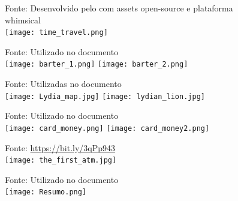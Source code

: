 \documentclass[aspectratio=43,8pt]{beamer}%
\begin{document}
\begin{frame}[noframenumbering]
	\begin{figure}
		\centering
		{\footnotesize Fonte: Desenvolvido pelo com assets open-source e plataforma whimsical}\\
		\texttt{[image: time\_travel.png]}
		\caption{}
	\end{figure}
\end{frame}
\begin{frame}[noframenumbering]
	\begin{figure}
		\centering
		{\footnotesize Fonte: Utilizado no documento}\\
		\texttt{[image: barter\_1.png]}
		\texttt{[image: barter\_2.png]}
		\caption{}
	\end{figure}
\end{frame}
\begin{frame}[noframenumbering]
	\begin{figure}
		\centering
		{\footnotesize Fonte: Utilizadas no documento}\\
		\texttt{[image: Lydia\_map.jpg]}
		\texttt{[image: lydian\_lion.jpg]}
		\caption{}
	\end{figure}
\end{frame}
\begin{frame}[noframenumbering]
	\begin{figure}
		\centering
		{\footnotesize Fonte: Utilizado no documento}\\
		\texttt{[image: card\_money.png]}
		\texttt{[image: card\_money2.png]}
		\caption{}
	\end{figure}
\end{frame}
\begin{frame}[noframenumbering]
	\begin{figure}
		\centering
		{\footnotesize Fonte: \url{https://bit.ly/3qPp943}}\\
		\texttt{[image: the\_first\_atm.jpg]}
		\caption{}
	\end{figure}
\end{frame}
\begin{frame}[noframenumbering]
		\begin{figure}
		\centering
		{\footnotesize Fonte: Utilizado no documento}\\
		\texttt{[image: Resumo.png]}
		\caption{}
	\end{figure}
\end{frame}
\end{document}
